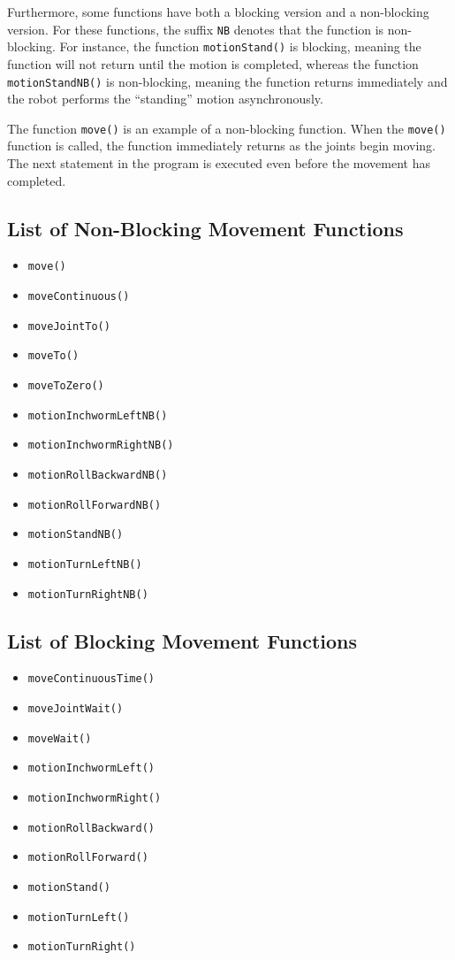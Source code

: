 \documentclass{article}
\begin{document}
Furthermore, some functions have both a blocking version and a non-blocking
version. For these functions, the suffix \texttt{NB} denotes that the function
is non-blocking. For instance, the function \texttt{motionStand()} is blocking,
meaning the function will not return until the motion is completed, whereas
the function \texttt{motionStandNB()} is non-blocking, meaning the function
returns immediately and the robot performs the ``standing'' motion
asynchronously.

The function \texttt{move()} is an example of a non-blocking function. When
the \texttt{move()} function is called, the function immediately returns 
as the joints begin moving. The next statement in the program is executed
even before the movement has completed. 

\subsection{List of Non-Blocking Movement Functions}
\begin{itemize}
\item \texttt{move()}
\item \texttt{moveContinuous()}
\item \texttt{moveJointTo()}
\item \texttt{moveTo()}
\item \texttt{moveToZero()}
\item \texttt{motionInchwormLeftNB()}
\item \texttt{motionInchwormRightNB()}
\item \texttt{motionRollBackwardNB()}
\item \texttt{motionRollForwardNB()}
\item \texttt{motionStandNB()}
\item \texttt{motionTurnLeftNB()}
\item \texttt{motionTurnRightNB()}
\end{itemize}

\subsection{List of Blocking Movement Functions}
\begin{itemize}
\item \texttt{moveContinuousTime()}
\item \texttt{moveJointWait()}
\item \texttt{moveWait()}
\item \texttt{motionInchwormLeft()}
\item \texttt{motionInchwormRight()}
\item \texttt{motionRollBackward()}
\item \texttt{motionRollForward()}
\item \texttt{motionStand()}
\item \texttt{motionTurnLeft()}
\item \texttt{motionTurnRight()}
\end{itemize}
\end{document}

